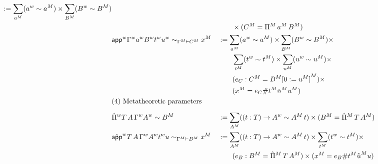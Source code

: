 \begin{alignat*}{5}
   :=
      \sum_{\model{a}} (\wf{a}\sim\model{a})
      \times
      \sum_{\model{B}} (\wf{B}\sim\model{B})
      \\
      &&& \qquad \times (\model{C}= \model{\Pi}\,\model{a}\,\model{B})
  \\
  &
  \relt{\appw \wf{\Gamma} \wf{a} \wf{B} \wf{t} \wf{u}}{\model{\Gamma}}{\model{C}}{\model{x}}  &&
    :=
      \sum_{\model{a}} (\wf{a}\sim\model{a})
      \times
      \sum_{\model{B}} (\wf{B}\sim\model{B})
      \times
      \\
      & && \qquad
      \sum_{\model{t}} (\wf{t}\sim\model{t})
      \times
      \sum_{\model{u}} (\wf{u}\sim\model{u})
      \times
      \\
      & &&
     \qquad  (e_C : \model{C} = \model{B}\model{[0 := \model{u}]})
      \times
      \\
      & &&
      \qquad
      (\model{x} = e_C \# \model{t} \model{\oldapp}\model{u})
    \\
  & \rlap{(4) Metatheoretic parameters} \\[0.5em]
  & \Pimw T\,A\,\wf{\Gamma}\wf{A} \sim \model{B} &&
    :=
      \sum_{\model{A}} ((t : T) \ra \wf{A}\sim\model{A}\, t)
      \times
      (\model{B} = \model{\Pim}\,T\,\model{A})
    \\
    & \relt{\appmw T\,A\,\wf{\Gamma}\wf{A} \wf{t} u}{\model{\Gamma}}{\model{B}}{\model{x}}
     &&
     :=
      \sum_{\model{A}} ((t : T) \ra \wf{A}\sim\model{A}\, t)
      \times
      \sum_{\model{t}} (\wf{t}\sim\model{t})
      \times
      \\ & &&
      \qquad
      (e_B : \model{B} = \model{\Pim}\,T\,\model{A})
      \times
      (\model{x} = e_B \# \model{t}\model{\hat{\oldapp}}u)
\end{alignat*}

